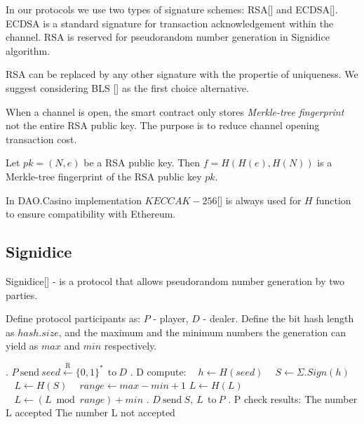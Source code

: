 In our protocols we use two types of signature schemes: RSA[] and ECDSA[]. ECDSA is a standard signature for transaction acknowledgement within the channel. RSA is reserved for pseudorandom number generation in Signidice algorithm.

\begin{remark}
RSA can be replaced by any other signature with the propertie of uniqueness. We suggest considering BLS [] as the first choice alternative.
\end{remark}

When a channel is open, the smart contract only stores \textit {Merkle-tree fingerprint} not the entire RSA public key. The purpose is to reduce channel opening transaction cost.

\begin{defn}
Let $pk = (N, e)$ be a RSA public key. Then $f = H(H(e), H(N))$ is a Merkle-tree fingerprint of the RSA public key $pk$. 
\end{defn}
\begin{remark}
In DAO.Casino implementation $KECCAK-256$[] is always used for $H$ function to ensure compatibility with Ethereum. 
\end{remark}

	\subsection{Signidice}

Signidice[] - is a protocol that allows pseudorandom number generation by two parties. 

Define protocol participants as: $P$ - player, $D$ - dealer. Define the bit hash length as $hash.size$, and the maximum and the minimum numbers the generation can yield as $max$ and $ min$ respectively.

\begin{algorithm} 
\caption*{$\textbf{Signidice}$} \label{alg:signidice}
\begin{algorithmic}
. $ P \ \text{send}\  seed\xleftarrow{\text{R}} \{0,1\}^* \  \ \text{to} \ D$
. D compute:
\State $\ \ \ \ h \gets H(seed)$
\State $\ \ \ \ S \gets  \Sigma . Sign(h)$
\State $\ \ \ \ L \gets H(S) $
\State $\ \ \ \ range \gets max - min +1$
\State$ L \gets H(L)$
\EndWhile
\State $ \ \ \ \  L \gets (L \bmod range) + min $
. $D \ \text{send}\  S, \ L \ \   \text{to} \ P$
. P check results:
\State The number L accepted
\Else 
\State The number L not accepted
\EndIf
\end{algorithmic}
\end{algorithm}

